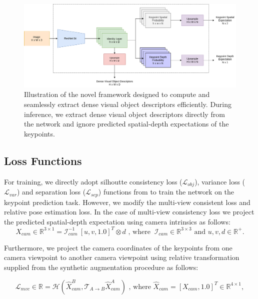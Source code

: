 \begin{figure}[htb]
    \centering
    \includegraphics[scale=0.325]{images/arch.png}
    \caption{Illustration of the novel framework designed to compute and seamlessly extract dense visual object descriptors efficiently.
        During inference, we extract dense visual object descriptors directly from the network and ignore predicted spatial-depth expectations of the keypoints.}
    \label{fig:modified_dnn}
\end{figure}


\subsection{Loss Functions}

For training, we directly adopt silhoutte consistency loss ($\mathcal{L}_{obj}$), variance loss ($\mathcal{L}_{var}$) and separation loss ($\mathcal{L}_{sep}$) functions from \cite{suwajanakorn2018discovery} to train the network on the keypoint prediction task.
However, we modify the multi-view consistent loss and relative pose estimation loss. In the case of multi-view consistency loss we
project the predicted spatial-depth expectation using camera intrinsics as follows:
\begin{equation}
    X_{cam} \in \mathbb{R}^{3 \times 1} = \mathcal{I}_{cam}^{-1}  \ [u, v, 1.0]^T \otimes d \text{ , where  } \ \mathcal{I}_{cam} \in \mathbb{R}^{3 \times 3} \text{ and }  u, v, d \in \mathbb{R}^+.
\end{equation}

Furthermore, we project the camera coordinates of the keypoints from one camera viewpoint to another camera viewpoint using relative transformation supplied from the synthetic augmentation procedure as follows:

\begin{equation}
    \label{eqn:mvc}
    \mathcal{L}_{mvc} \in \mathbb{R} = \mathcal{H}(\hat{X}^B_{cam}, \mathcal{T}_{A \rightarrow B} \hat{X}^A_{cam}) \text{ , where  } \hat{X}_{cam}=[X_{cam}, 1.0]^T \in \mathbb{R}^{4 \times 1} ,
\end{equation}


